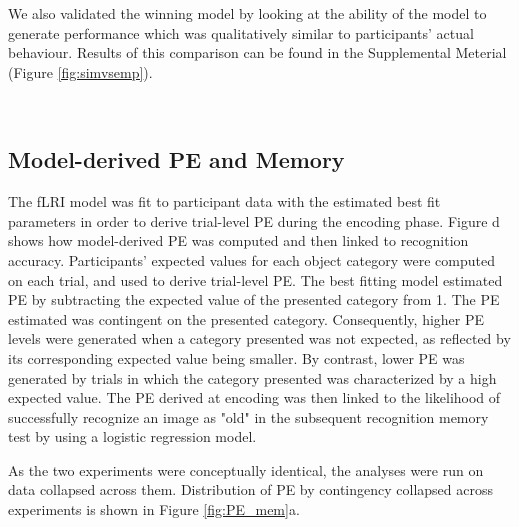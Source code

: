 \documentclass[a4paper,12pt]{article}
\begin{document}
We also validated the winning model by looking at the ability of the model to generate performance which was qualitatively similar to participants' actual behaviour. Results of this comparison can be found in the Supplemental Meterial (Figure \ref{fig:simvsemp}). 


\








\subsection{Model-derived PE and Memory}
The fLRI model was fit to participant data with the estimated best fit parameters in order to derive trial-level PE during the encoding phase. Figure \label{fig:Methods}d shows how model-derived PE was computed and then linked to recognition accuracy. Participants' expected values for each object category were computed on each trial, and used to derive trial-level PE. The best fitting model estimated PE by subtracting the expected value of the presented category from 1. The PE estimated was contingent on the presented category. Consequently, higher PE levels were generated when a category presented was not expected, as reflected by its corresponding expected value being smaller. By contrast, lower PE was generated by trials in which the category presented was characterized by a high expected value. The PE derived at encoding was then linked to the likelihood of successfully recognize an image as "old" in the subsequent recognition memory test by using a logistic regression model. \par 
As the two experiments were conceptually identical, the analyses were run on data collapsed across them. Distribution of PE by contingency collapsed across experiments is shown in Figure \ref{fig:PE_mem}a. 
\end{document}
